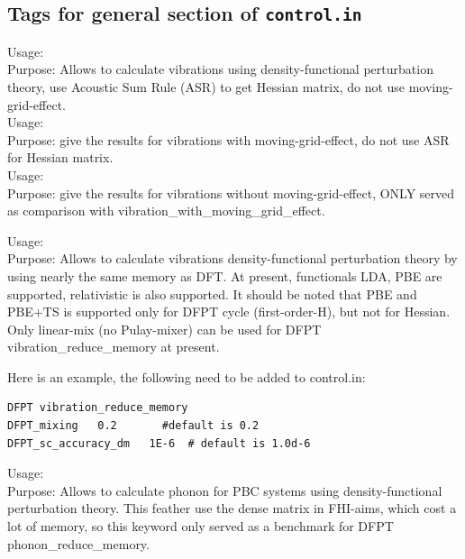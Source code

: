 {\clearpage

\subsection*{Tags for general section of \texttt{control.in}}
{
Usage:  \\[1.0em]
  Purpose:  Allows to calculate vibrations using density-functional perturbation theory, use Acoustic Sum Rule (ASR) to get Hessian matrix, do not use moving-grid-effect.\\


Usage:  \\[1.0em]
  Purpose: give the results for vibrations with moving-grid-effect, do not use ASR for Hessian matrix.\\ 

Usage:  \\[1.0em]
  Purpose: give the results for vibrations without moving-grid-effect, ONLY served as comparison with vibration\_with\_moving\_grid\_effect.\\ }



{
Usage:  \\[1.0em]
  Purpose: Allows to calculate vibrations density-functional perturbation theory by using nearly the same memory as DFT.  At present, functionals LDA, PBE are supported, relativistic is also supported. It should be noted that PBE and PBE+TS is supported only for DFPT cycle (first-order-H), but not for Hessian.  Only linear-mix (no Pulay-mixer) can be used for DFPT vibration\_reduce\_memory at present.\\ }

Here is an example,  the following need to be added to control.in:
\begin{verbatim} 
DFPT vibration_reduce_memory
DFPT_mixing   0.2       #default is 0.2
DFPT_sc_accuracy_dm   1E-6  # default is 1.0d-6
\end{verbatim}  

{
Usage:  \\[1.0em]
  Purpose: Allows to calculate phonon for PBC systems using density-functional perturbation theory. This feather use the dense matrix in FHI-aims, which cost a lot of memory, so this keyword only served as a benchmark for DFPT phonon\_reduce\_memory.  \\ }

}
